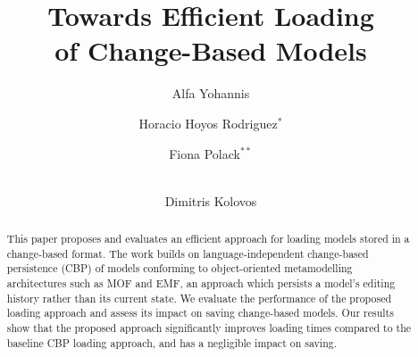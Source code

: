 \documentclass{llncs}
\begin{document}
    \renewcommand{\thelstlisting}{\arabic{lstlisting}}
    \renewcommand{\labelitemi}{$\bullet$}
    \newcommand{\dk}[1]{\textbf{[DK: #1]}}
    
    \title{Towards Efficient Loading \\ of Change-Based Models}
    \author{
Alfa Yohannis \and Horacio Hoyos Rodriguez$^{*}$ \and Fiona Polack$^{**}$ \and \\ Dimitris Kolovos
    }
    
    
    \maketitle      %
    \begin{abstract}
This paper proposes and evaluates an efficient approach for loading models stored in a change-based format. The work builds on language-independent change-based persistence (CBP) of models conforming to object-oriented metamodelling architectures such as MOF and EMF, an approach which persists a model's editing history rather than its current state. We evaluate the performance of the proposed loading approach and assess its impact on saving change-based models. Our results show that the proposed approach significantly improves loading times compared to the baseline CBP loading approach, and has a negligible impact on saving.

    \end{abstract}
    
\end{document}
